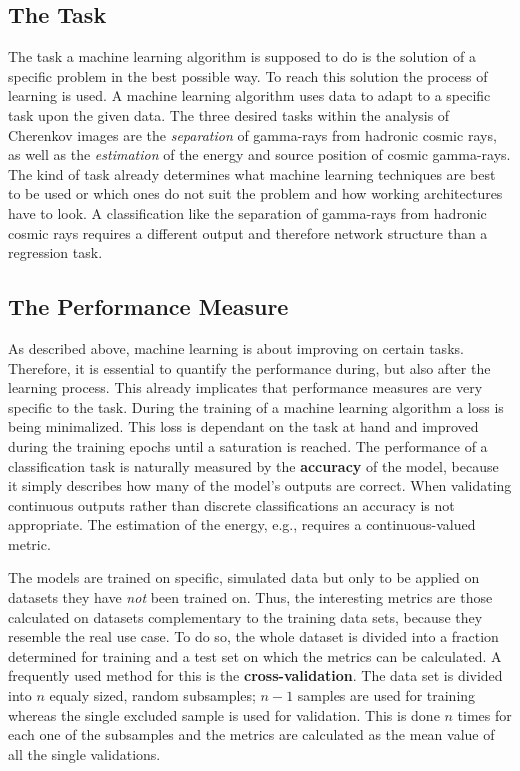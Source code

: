 \subsection{The Task}
%
The task a machine learning algorithm is supposed to do is the solution of a
specific problem in the best possible way. To reach this solution the process
of learning is used. A machine learning algorithm uses data to adapt to a specific task upon the given data. The three desired tasks
within the analysis of Cherenkov images are the \textit{separation} of
gamma-rays from hadronic cosmic rays, as well as the \textit{estimation} of the
energy and source position of cosmic gamma-rays. The kind of task already
determines what machine learning techniques are best to be used or which ones
do not suit the problem and how working architectures have to look. A
classification like the separation of gamma-rays from hadronic cosmic rays
requires a different output and therefore network structure than a regression
task.

\subsection{The Performance Measure}
%
As described above, machine learning is about improving on certain tasks.
Therefore, it is essential to quantify the performance during, but also after the
learning process. This already implicates that performance measures are very
specific to the task. During the training of a machine learning algorithm a
loss is being minimalized. This loss is dependant on the task at hand and improved during the training epochs until a saturation is reached. The performance of a classification task is naturally
measured by the \textbf{accuracy} of the model, because it simply describes how
many of the model's outputs are correct. When validating continuous outputs
rather than discrete classifications an accuracy is not appropriate. The
estimation of the energy, e.g., requires a continuous-valued metric.

The models are trained on specific, simulated data but only to be applied on
datasets they have \textit{not} been trained on. Thus, the interesting metrics
are those calculated on datasets complementary to the training data sets,
because they resemble the real use case. To do so, the whole dataset is divided
into a fraction determined for training and a test set on which the metrics can
be calculated. A frequently used method for this is the
\textbf{cross-validation}. The data set is divided into $n$ equaly sized, random
subsamples; $n-1$ samples are used for training whereas the single excluded
sample is used for validation. This is done $n$ times for each one of the
subsamples and the metrics are calculated as the mean value of all the single
validations.


